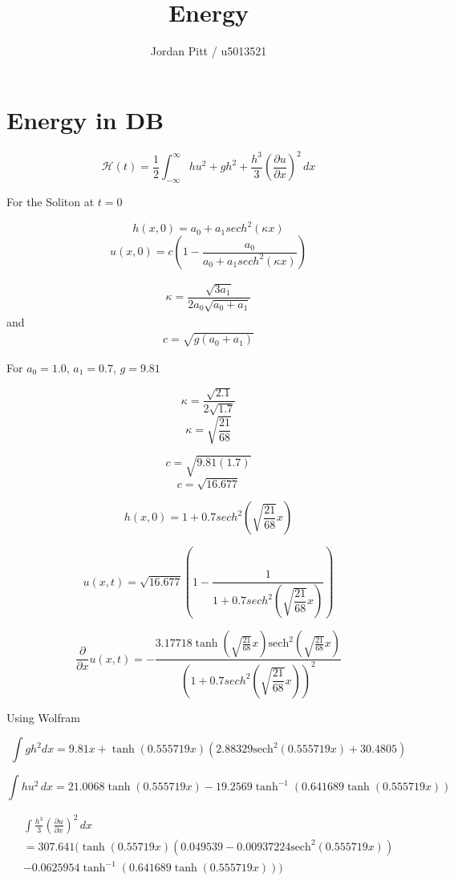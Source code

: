 \documentclass[12pt]{article}
\begin{document}
\title{Energy}
\author{Jordan Pitt / u5013521}

\section{Energy in DB}

\[\mathcal{H} (t) = \frac{1}{2}\int_{-\infty}^{\infty} hu^2 + gh^2 + \frac{h^3}{3} \left(\frac{\partial u}{\partial x}\right)^2\, dx \]

For the Soliton at $t = 0 $

\[h(x,0) = a_0 + a_1 sech^2\left(\kappa x\right)\]
\[u(x,0) = c\left(1 - \frac{a_0}{a_0 + a_1 sech^2\left(\kappa x\right)}\right)\]


\begin{gather}
\kappa = \dfrac{\sqrt{3a_1}}{2a_0 \sqrt{ a_0 + a_1}}
\end{gather}
and
\begin{gather}
c = \sqrt{g \left(a_0 + a_1\right)}
\end{gather}

For $a_0 = 1.0$,  $a_1 = 0.7$, $g = 9.81$

\[\kappa = \dfrac{\sqrt{2.1}}{2 \sqrt{ 1.7}}\]
\[\kappa = \sqrt{\dfrac{21}{68}}\]

\[c = \sqrt{9.81 \left(1.7\right)}\]
\[c = \sqrt{16.677}\]

\[h(x,0) = 1 + 0.7 sech^2\left(\sqrt{\dfrac{21}{68}}x\right)\]

\[u(x,t) = \sqrt{16.677}\left(1 - \frac{1}{1+ 0.7 sech^2\left(\sqrt{\dfrac{21}{68}} x\right)}\right)\]

\[\frac{\partial }{\partial x}u(x,t) = -\frac{3.17718 \tanh\left(\sqrt{\frac{21}{68}} x\right)\text{sech}^2\left(\sqrt{\frac{21}{68}} x\right)}{\left(1+ 0.7 sech^2\left(\sqrt{\dfrac{21}{68}} x\right) \right)^2}\]

Using Wolfram


\[\int gh^2  dx = 9.81x + \tanh\left(0.555719 x\right)\left(2.88329 \text{sech}^2\left(0.555719 x\right) + 30.4805\right)  \]

\[\int hu^2 \, dx = 21.0068\tanh\left(0.555719 x\right) - 19.2569\tanh^{-1}\left(0.641689 \tanh\left(0.555719 x\right)\right) \]

\begin{multline}
\int \frac{h^3}{3} \left(\frac{\partial u}{\partial x}\right)^2\,  dx  \\
= 307.641 \Bigg(\tanh\left(0.55719 x\right)\left(0.049539 - 0.00937224\text{sech}^2\left(0.555719 x\right)\right) \\  - 0.0625954\tanh^{-1}\left(0.641689 \tanh\left(0.555719 x\right)\right) \Bigg)
\end{multline}
\end{document}
